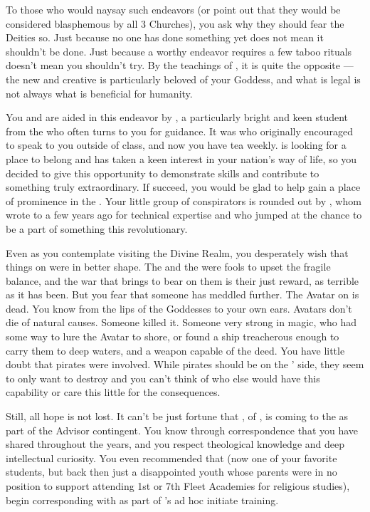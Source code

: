 \documentclass[char]{GL2020}
\begin{document}
To those who would naysay such endeavors (or point out that they would be considered blasphemous by all 3 Churches), you ask why they should fear the Deities so. Just because no one has done something yet does not mean it shouldn't be done. Just because a worthy endeavor requires a few taboo rituals doesn't mean you shouldn't try. By the teachings of \cFlow{}, it is quite the opposite — the new and creative is particularly beloved of your Goddess, and what is legal is not always what is beneficial for humanity. 

You and \cCurse{} are aided in this endeavor by \cAmbition{\full}, a particularly bright and keen student from the \pTech{} who often turns to you for guidance. It was \cWarlordDaughter{} who originally encouraged \cAmbition{} to speak to you outside of class, and now you have tea weekly. \cAmbition{} is looking for a place to belong and has taken a keen interest in your nation’s way of life, so you decided to give \cAmbition{\them} this opportunity to demonstrate \cAmbition{\their} skills and contribute to something truly extraordinary. If \cAmbition{\they} succeed\cAmbition{\verbs}, you would be glad to help \cAmbition{\them} gain a place of prominence in the \pShip{}. Your little group of conspirators is rounded out by \cAssistantScientist{\full}, whom \cCurse{} wrote to a few years ago for \cAssistantScientist{\their} technical expertise and who jumped at the chance to be a part of something this revolutionary. 

Even as you contemplate visiting the Divine Realm, you desperately wish that things on \pEarth{} were in better shape. The \pFarm{} and the \pTech{} were fools to upset the fragile balance, and the war that \cLoud{\full} brings to bear on them is their just reward, as terrible as it has been. But you fear that someone has meddled further. The \cEbb{} Avatar on \pEarth{} is dead. You know from the lips of the Goddesses to your own ears. Avatars don't die of natural causes. Someone killed it. Someone very strong in magic, who had some way to lure the Avatar to shore, or found a ship treacherous enough to carry them to deep waters, and a weapon capable of the deed. You have little doubt that pirates were involved. While pirates should be on the \pShip{}’ side, they seem to only want to destroy and you can’t think of who else would have this capability or care this little for the consequences.

Still, all hope is not lost. It can't be just fortune that \cEbbPriest{\full}, \cEbbPriest{\cleric} of \cEbb{}, is coming to the \pSchool{} as part of the \pShip{} Advisor contingent. You know \cEbbPriest{} through correspondence that you have shared throughout the years, and you respect \cEbbPriest{\their} theological knowledge and deep intellectual curiosity. You even recommended that \cWarlordDaughter{\full} (now one of your favorite students, but back then just a disappointed youth whose parents were in no position to support \cWarlordDaughter{\their} attending 1st or 7th Fleet Academies for religious studies), begin corresponding with \cEbbPriest{\them} as part of \cWarlordDaughter{}’s ad hoc initiate training. 
\end{document}
